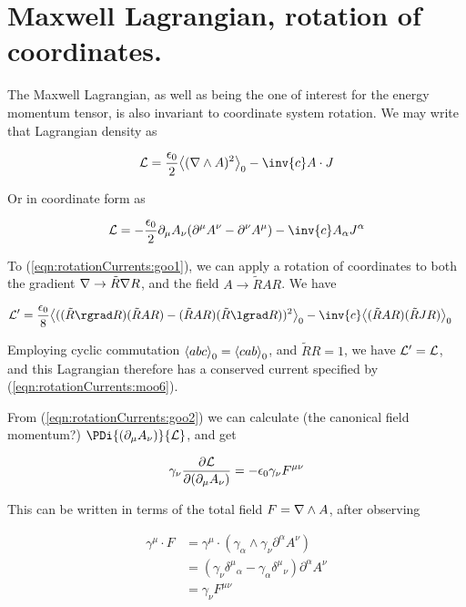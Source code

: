 \section{Maxwell Lagrangian, rotation of coordinates.}

The Maxwell Lagrangian, as well as being the one of interest for the energy momentum tensor, is also invariant to coordinate system rotation.  We may write that Lagrangian density as

\begin{align}\label{eqn:rotationCurrents:goo1}
\LL = \frac{\epsilon_0}{2} \gpgradezero{(\grad \wedge A)^2} - \inv{c} A \cdot J
\end{align}

Or in coordinate form as

\begin{align}\label{eqn:rotationCurrents:goo2}
\LL = -\frac{\epsilon_0}{2} \partial_\mu A_\nu (\partial^\mu A^\nu - \partial^\nu A^\mu) - \inv{c} A_\alpha J^\alpha
\end{align}

To (\ref{eqn:rotationCurrents:goo1}), we can apply a rotation of coordinates to both the gradient $\nabla \rightarrow \tilde{R} \nabla R$, and the field $A \rightarrow \tilde{R} A R$.  We have

\begin{align}\label{eqn:rotationCurrents:goo3}
\LL' &= \frac{\epsilon_0}{8} \gpgradezero{((\tilde{R} \rgrad R) (\tilde{R} A R) - (\tilde{R} A R) (\tilde{R} \lgrad R))^2} - \inv{c} \gpgradezero{ (\tilde{R} A R) (\tilde{R} J R)}
\end{align}

Employing cyclic commutation ${\left\langle{{ a b c}}\right\rangle}_{0} = {\left\langle{{ c a b }}\right\rangle}_{0}$, and $\tilde{R} R = 1$, we have $\mathcal{L}' = \mathcal{L}$, and this Lagrangian therefore has a conserved current specified by (\ref{eqn:rotationCurrents:moo6}).

From (\ref{eqn:rotationCurrents:goo2}) we can calculate (the canonical field momentum?) $\PDi{(\partial_\mu {A}_\nu)}{\LL}$, and get

\begin{align}\label{eqn:rotationCurrents:goo4}
\gamma_\nu \frac{\partial {\mathcal{L}}}{\partial {(\partial_\mu {A}_\nu)}} = -\epsilon_0 \gamma_\nu F^{\mu\nu}
\end{align}

This can be written in terms of the total field $F = \nabla \wedge A$, after observing

\begin{align*}
\gamma^\mu \cdot F
&=
\gamma^\mu \cdot (\gamma_\alpha \wedge \gamma_\nu \partial^\alpha A^\nu) \\
&=
(\gamma_\nu {\delta^\mu}_\alpha - \gamma_\alpha {\delta^\mu}_\nu ) \partial^\alpha A^\nu \\
&=
\gamma_\nu F^{\mu\nu}
\end{align*}

